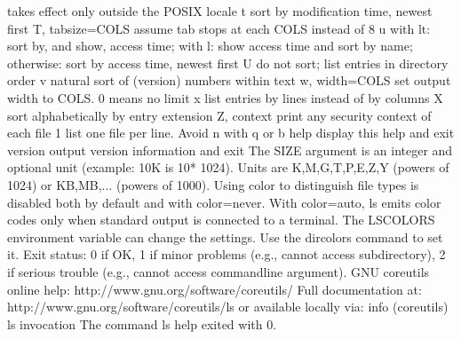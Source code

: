 \documentclass[letterpaper,12pt,english]{sphinxmanual}
\begin{document}
\begin{sphinxVerbatim}[commandchars=\\\{\}]
                               takes effect only outside the POSIX locale
  \PYGZhy{}t                         sort by modification time, newest first
  \PYGZhy{}T, \PYGZhy{}\PYGZhy{}tabsize=COLS         assume tab stops at each COLS instead of 8
  \PYGZhy{}u                         with \PYGZhy{}lt: sort by, and show, access time;
                               with \PYGZhy{}l: show access time and sort by name;
                               otherwise: sort by access time, newest   first
  \PYGZhy{}U                         do not sort; list entries in directory order
  \PYGZhy{}v                         natural sort of (version) numbers within text
  \PYGZhy{}w, \PYGZhy{}\PYGZhy{}width=COLS           set output width to COLS.  0 means no limit
  \PYGZhy{}x                         list entries by lines instead of by columns
  \PYGZhy{}X                         sort alphabetically by entry extension
  \PYGZhy{}Z, \PYGZhy{}\PYGZhy{}context              print any security context of each file
  \PYGZhy{}1                         list one file per line.  Avoid \PYGZsq{}\PYGZbs{}n\PYGZsq{} with \PYGZhy{}q   or \PYGZhy{}b
      \PYGZhy{}\PYGZhy{}help     display this help and exit
      \PYGZhy{}\PYGZhy{}version  output version information and exit
The SIZE argument is an integer and optional unit (example: 10K is 10*  1024).
Units are K,M,G,T,P,E,Z,Y (powers of 1024) or KB,MB,... (powers of 1000).
Using color to distinguish file types is disabled both by default and
with \PYGZhy{}\PYGZhy{}color=never.  With \PYGZhy{}\PYGZhy{}color=auto, ls emits color codes only when
standard output is connected to a terminal.  The LS\PYGZus{}COLORS environment
variable can change the settings.  Use the dircolors command to set it.
Exit status:
 0  if OK,
 1  if minor problems (e.g., cannot access subdirectory),
 2  if serious trouble (e.g., cannot access command\PYGZhy{}line argument).
GNU coreutils online help: \PYGZlt{}http://www.gnu.org/software/coreutils/\PYGZgt{}
Full documentation at: \PYGZlt{}http://www.gnu.org/software/coreutils/ls\PYGZgt{}
or available locally via: info \PYGZsq{}(coreutils) ls invocation\PYGZsq{}
The command \PYGZdq{}ls \PYGZhy{}\PYGZhy{}help\PYGZdq{} exited with 0.
\end{sphinxVerbatim}
\end{document}

